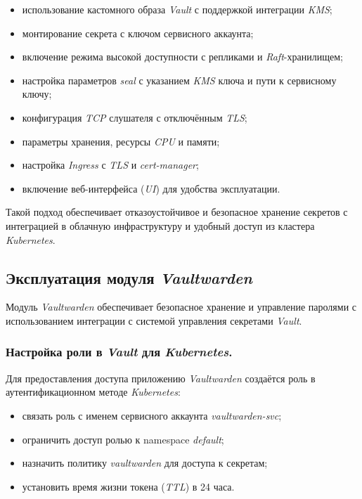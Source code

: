 \begin{itemize}
    \item использование кастомного образа \textit{Vault} с поддержкой интеграции \textit{KMS};
    \item монтирование секрета с ключом сервисного аккаунта;
    \item включение режима высокой доступности с репликами и \textit{Raft}-хранилищем;
    \item настройка параметров \textit{seal} с указанием \textit{KMS} ключа и пути к сервисному ключу;
    \item конфигурация \textit{TCP} слушателя с отключённым \textit{TLS};
    \item параметры хранения, ресурсы \textit{CPU} и памяти;
    \item настройка \textit{Ingress} с \textit{TLS} и \textit{cert-manager};
    \item включение веб-интерфейса (\textit{UI}) для удобства эксплуатации.
\end{itemize}

Такой подход обеспечивает отказоустойчивое и безопасное хранение секретов с интеграцией в облачную инфраструктуру и удобный доступ из кластера \textit{Kubernetes}.



\subsection{Эксплуатация модуля \textit{Vaultwarden}}

Модуль \textit{Vaultwarden} обеспечивает безопасное хранение и управление паролями с использованием интеграции с системой управления секретами \textit{Vault}.

\subsubsection{Настройка роли в \textit{Vault} для \textit{Kubernetes}.} Для предоставления доступа приложению \textit{Vaultwarden} создаётся роль в аутентификационном методе \textit{Kubernetes}:

\begin{itemize}
    \item связать роль с именем сервисного аккаунта \textit{vaultwarden-svc};
    \item ограничить доступ ролью к namespace \textit{default};
    \item назначить политику \textit{vaultwarden} для доступа к секретам;
    \item установить время жизни токена (\textit{TTL}) в 24 часа.
\end{itemize}

